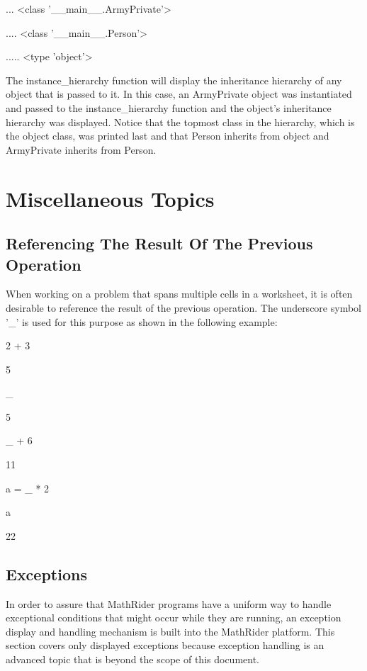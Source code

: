 \documentclass[12pt,oneside]{book}
\begin{document}
... {\textless}class '\_\_main\_\_.ArmyPrivate'{\textgreater}

.... {\textless}class '\_\_main\_\_.Person'{\textgreater}

..... {\textless}type 'object'{\textgreater}

The instance\_hierarchy function will display the inheritance hierarchy of any object that is passed to it. In this case, an ArmyPrivate object was instantiated and passed to the instance\_hierarchy function and the object's inheritance hierarchy was displayed. Notice that the topmost class in the hierarchy, which is the object class, was printed last and that Person inherits from object and ArmyPrivate inherits from Person. 


\chapter[Miscellaneous Topics]{Miscellaneous Topics}

\section[Referencing The Result Of The Previous Operation]{Referencing The Result Of The Previous Operation}

When working on a problem that spans multiple cells in a worksheet, it is often desirable to reference the result of the previous operation. The underscore symbol '\_' is used for this purpose as shown in the following example: 

2 + 3

{\textbar}

5

\_

{\textbar}

5


\_ + 6

{\textbar}

11


a = \_ * 2

a

{\textbar}

22

\section[Exceptions]{Exceptions}

In order to assure that MathRider programs have a uniform way to handle exceptional conditions that might occur while they are running, an exception display and handling mechanism is built into the MathRider platform. This section covers only displayed exceptions because exception handling is an advanced topic that is beyond the scope of this document. 
\end{document}
